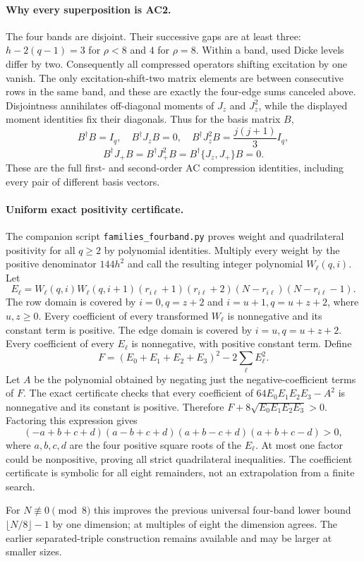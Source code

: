 \documentclass[11pt]{article}
\begin{document}
\paragraph{Why every superposition is AC2.}
The four bands are disjoint. Their successive gaps are at least three:
$h-2(q-1)=3$ for $\rho<8$ and $4$ for $\rho=8$.
Within a band, used Dicke levels differ by two. Consequently all compressed
operators shifting excitation by one vanish. The only excitation-shift-two
matrix elements are between consecutive rows in the same band, and these
are exactly the four-edge sums canceled above. Disjointness annihilates
off-diagonal moments of $J_z$ and $J_z^2$, while the displayed moment
identities fix their diagonals. Thus for the basis matrix $B$,
\[
 B^\dagger B=I_q,\quad B^\dagger J_zB=0,\quad
 B^\dagger J_z^2B=\frac{j(j+1)}3I_q,
\]
\[
 B^\dagger J_+B=B^\dagger J_+^2B=
 B^\dagger\{J_z,J_+\}B=0.
\]
These are the full first- and second-order AC compression identities,
including every pair of different basis vectors.

\paragraph{Uniform exact positivity certificate.}
The companion script \texttt{families\_fourband.py} proves weight and
quadrilateral positivity for all $q\ge2$ by polynomial identities.
Multiply every weight by the positive denominator $144h^2$ and call
the resulting integer polynomial $W_\ell(q,i)$. Let
\[
 E_\ell=W_\ell(q,i)W_\ell(q,i+1)
 (r_{i\ell}+1)(r_{i\ell}+2)(N-r_{i\ell})(N-r_{i\ell}-1).
\]
The row domain is covered by $i=0,q=z+2$ and
$i=u+1,q=u+z+2$, where $u,z\ge0$. Every coefficient of every transformed
$W_\ell$ is nonnegative and its constant term is positive. The edge domain
is covered by $i=u,q=u+z+2$. Every coefficient of every $E_\ell$ is
nonnegative, with positive constant term. Define
\[
 F=(E_0+E_1+E_2+E_3)^2-2\sum_\ell E_\ell^2.
\]
Let $A$ be the polynomial obtained by negating just the negative-coefficient
terms of $F$. The exact certificate checks that every coefficient of
$64E_0E_1E_2E_3-A^2$ is nonnegative and its constant is positive.
Therefore $F+8\sqrt{E_0E_1E_2E_3}>0$. Factoring this expression gives
\[
 (-a+b+c+d)(a-b+c+d)(a+b-c+d)(a+b+c-d)>0,
\]
where $a,b,c,d$ are the four positive square roots of the $E_\ell$.
At most one factor could be nonpositive, proving all strict quadrilateral
inequalities. The coefficient certificate is symbolic for all eight
remainders, not an extrapolation from a finite search.

For $N\not\equiv0\pmod8$ this improves the previous universal four-band
lower bound $\lfloor N/8\rfloor-1$ by one dimension; at multiples of eight
the dimension agrees. The earlier separated-triple construction remains
available and may be larger at smaller sizes.
\end{document}
